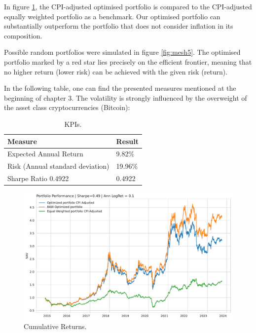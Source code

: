 \documentclass{article}
\begin{document}
In figure \ref{fig:mesh4}, the CPI-adjusted optimised portfolio is compared to the CPI-adjusted equally weighted portfolio as a benchmark. Our optimised portfolio can substantially outperform the portfolio that does not consider inflation in its composition.

Possible random portfolios were simulated in figure \ref{fig:mesh5}. The optimised portfolio marked by a red star lies precisely on the efficient frontier, meaning that no higher return (lower risk) can be achieved with the given risk (return).

In the following table, one can find the presented measures mentioned at the beginning of chapter 3. The volatility is strongly influenced by the overweight of the asset class cryptocurrencies (Bitcoin):

\begin{table}[H]
\centering
\begin{tabular}{ | m{7cm} | m{4cm} | }
 \hline
 \textbf{Measure} & \textbf{Result} \\
 \hline
 Expected Annual Return & 9.82\% \\ 
 \hline
 Risk (Annual standard deviation) & 19.96\% \\
 \hline
 Sharpe Ratio 0.4922 & 0.4922 \\ 
 \hline
\end{tabular}
 \label{table:tab2}
 \caption{KPIs.}
\end{table}

\begin{figure}[H]
    \centering
    \includegraphics[width=1\textwidth]{paper/figure/PNL.pdf}
    \caption{Cumulative Returns.}
    \label{fig:mesh4}
\end{figure}
\end{document}
